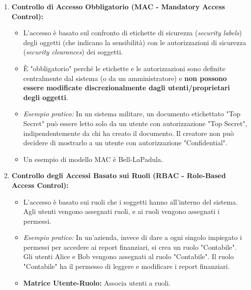 \begin{enumerate}
    \item \textbf{Controllo di Accesso Obbligatorio (MAC - Mandatory Access Control):}
    \begin{itemize}
        \item L'accesso è basato sul confronto di etichette di sicurezza (\textit{security labels}) degli oggetti (che indicano la sensibilità) con le autorizzazioni di sicurezza (\textit{security clearances}) dei soggetti.
        \item È "obbligatorio" perché le etichette e le autorizzazioni sono definite centralmente dal sistema (o da un amministratore) e \textbf{non possono essere modificate discrezionalmente dagli utenti/proprietari degli oggetti}.
        \item \textit{Esempio pratico:} In un sistema militare, un documento etichettato "Top Secret" può essere letto solo da un utente con autorizzazione "Top Secret", indipendentemente da chi ha creato il documento. Il creatore non può decidere di mostrarlo a un utente con autorizzazione "Confidential".
        \item Un esempio di modello MAC è Bell-LaPadula.
    \end{itemize}

    \item \textbf{Controllo degli Accessi Basato sui Ruoli (RBAC - Role-Based Access Control):}
    \begin{itemize}
        \item L'accesso è basato sui ruoli che i soggetti hanno all'interno del sistema. Agli utenti vengono assegnati ruoli, e ai ruoli vengono assegnati i permessi.
        \item \textit{Esempio pratico:} In un'azienda, invece di dare a ogni singolo impiegato i permessi per accedere ai report finanziari, si crea un ruolo "Contabile". Gli utenti Alice e Bob vengono assegnati al ruolo "Contabile". Il ruolo "Contabile" ha il permesso di leggere e modificare i report finanziari.
        \item \textbf{Matrice Utente-Ruolo:} Associa utenti a ruoli.
        \begin{figure}[H]
        \centering
\end{figure}
\end{itemize}
\end{enumerate}
